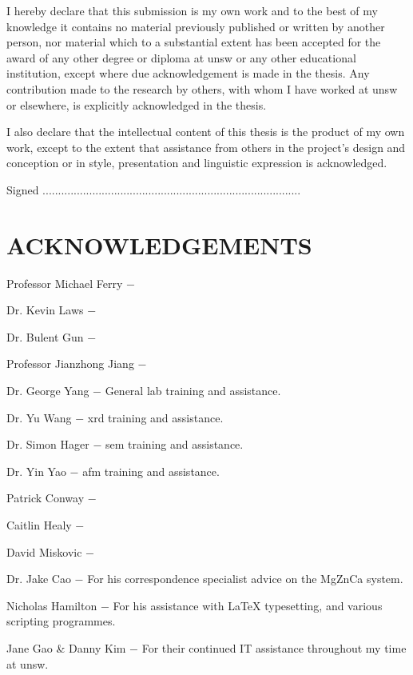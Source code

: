 \documentclass[a4paper,12pt,oneside]{report}%
\begin{document}
I hereby declare that this submission is my own work and to the best of my knowledge it
contains no material previously published or written by another person, nor material which
to a substantial extent has been accepted for the award of any other degree or diploma
at \acrshort{unsw} or any other educational institution, except where due acknowledgement is
made in the thesis. Any contribution made to the research by others, with whom I have
worked at \acrshort{unsw} or elsewhere, is explicitly acknowledged in the thesis.

I also declare that the intellectual content of this thesis is the product of my own work,
except to the extent that assistance from others in the project’s design and conception
or in style, presentation and linguistic expression is acknowledged.

\vspace{2cm}

Signed ...................................................................................



\chapter*{ACKNOWLEDGEMENTS}

Professor Michael Ferry $-$ 

Dr. Kevin Laws $-$ 

Dr. Bulent Gun $-$ 

Professor Jianzhong Jiang $-$

Dr. George Yang $-$ General lab training and assistance.

Dr. Yu Wang $-$ \acrshort{xrd} training and assistance.

Dr. Simon Hager $-$ \acrshort{sem} training and assistance.

Dr. Yin Yao $-$ \acrshort{afm} training and assistance.

Patrick Conway $-$ 

Caitlin Healy $-$ 

David Miskovic $-$ 

Dr. Jake Cao $-$ For his correspondence specialist advice on the MgZnCa system.

Nicholas Hamilton $-$ For his assistance with \LaTeX{} typesetting, and various scripting programmes.

Jane Gao \& Danny Kim $-$ For their continued IT assistance throughout my time at \acrshort{unsw}.
\end{document}
